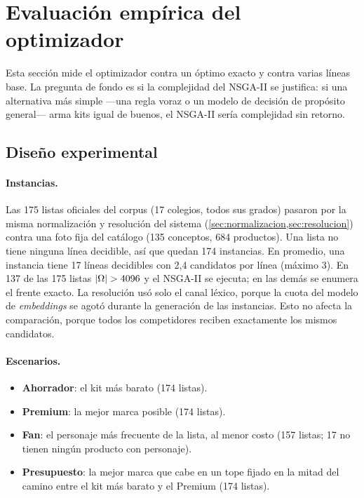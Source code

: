 \section{Evaluación empírica del optimizador}
\label{sec:evaluacion}

Esta sección mide el optimizador contra un óptimo exacto y contra varias
líneas base. La pregunta de fondo es si la complejidad del NSGA-II se
justifica: si una alternativa más simple ---una regla voraz o un modelo de
decisión de propósito general--- arma kits igual de buenos, el NSGA-II sería
complejidad sin retorno.

\subsection{Diseño experimental}

\paragraph{Instancias.} Las 175 listas oficiales del corpus (17 colegios,
todos sus grados) pasaron por la misma normalización y resolución del sistema
(\cref{sec:normalizacion,sec:resolucion}) contra una foto fija del catálogo
(135 conceptos, 684 productos). Una lista no tiene ninguna línea decidible, así
que quedan 174 instancias. En promedio, una instancia tiene 17 líneas
decidibles con 2,4 candidatos por línea (máximo 3). En 137 de las 175 listas
$\left\lvert \Omega \right\rvert>4096$ y el NSGA-II se ejecuta; en las demás se enumera el frente
exacto. La resolución usó solo el canal léxico, porque la cuota del modelo de
\emph{embeddings} se agotó durante la generación de las instancias. Esto no
afecta la comparación, porque todos los competidores reciben exactamente los
mismos candidatos.

\paragraph{Escenarios.}
\begin{itemize}
  \item \textbf{Ahorrador}: el kit más barato (174 listas).
  \item \textbf{Premium}: la mejor marca posible (174 listas).
  \item \textbf{Fan}: el personaje más frecuente de la lista, al menor costo
        (157 listas; 17 no tienen ningún producto con personaje).
  \item \textbf{Presupuesto}: la mejor marca que cabe en un tope fijado en la
        mitad del camino entre el kit más barato y el Premium (174 listas).
\end{itemize}

